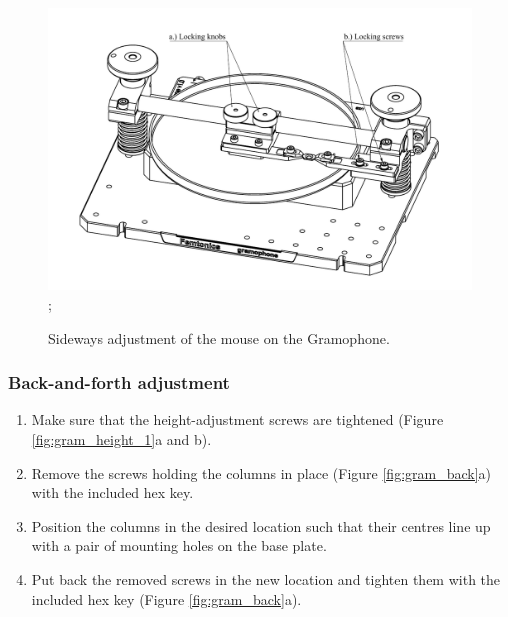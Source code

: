 \documentclass[11pt,a4paper]{article}
\begin{document}
\begin{figure}[H] %
\centering
\includegraphics[clip, trim=1cm 0cm 1cm 1cm, width=1.00\textwidth]{labels_side.PDF};
\caption{Sideways adjustment of the mouse on the Gramophone.}
\label{fig:labels_side}
\end{figure}

\subsubsection{Back-and-forth adjustment}
\begin{enumerate}
\item Make sure that the height-adjustment screws are tightened (Figure \ref{fig:gram_height_1}a and b).
\item Remove the screws holding the columns in place (Figure \ref{fig:gram_back}a) with the included hex key.
\item Position the columns in the desired location such that their centres line up with a pair of mounting holes on the base plate.
\item Put back the removed screws in the new location and tighten them with the included hex key (Figure \ref{fig:gram_back}a).
\end{enumerate}
\end{document}
